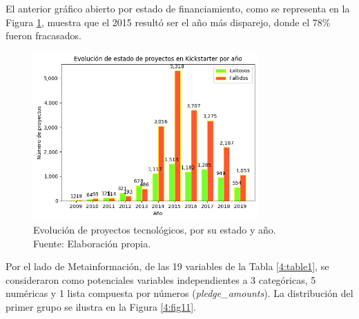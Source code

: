 El anterior gráfico abierto por estado de financiamiento, como se representa en la Figura \ref{4:fig10}, muestra que el 2015 resultó ser el año más disparejo, donde el 78\% fueron fracasados.

\begin{figure}[!ht]
	\begin{center}
		\includegraphics[width=0.77\textwidth]{4/figures/projects state evolution by year.png}
		\caption[Evolución de proyectos tecnológicos, por su estado y año]{Evolución de proyectos tecnológicos, por su estado y año.\\
			Fuente: Elaboración propia.}
		\label{4:fig10}
	\end{center}
\end{figure}

Por el lado de Metainformación, de las 19 variables de la Tabla \ref{4:table1}, se consideraron como potenciales variables independientes a 3 categóricas, 5 numéricas y 1 lista compuesta por números (\textit{pledge\_amounts}). La distribución del primer grupo se ilustra en la Figura \ref{4:fig11}.

